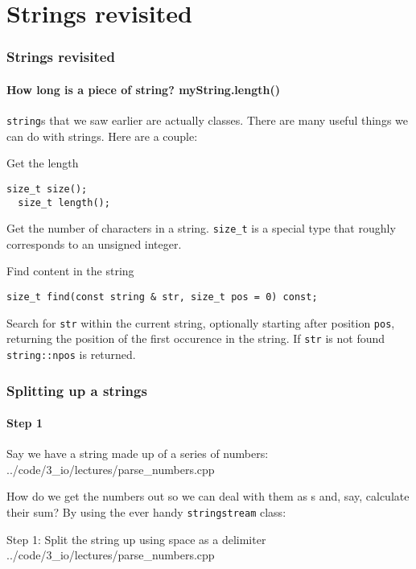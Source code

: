 \documentclass{beamer}
\begin{document}
\section{Strings revisited}

\begin{frame}[fragile]
  \frametitle{Strings revisited}
  \framesubtitle{How long is a piece of string? myString.length()}
  
  \texttt{string}s that we saw earlier are actually classes.  There are many useful things we can do with strings.  Here are a couple:
  \pause  
  \begin{block}{Get the length}
    \begin{lstlisting}[aboveskip=0pt]
  size_t size();
  size_t length();
    \end{lstlisting}
    Get the number of characters in a string.  \texttt{size\_t} is a special type that roughly corresponds to an unsigned integer.
  \end{block}
  \pause
  \begin{block}{Find content in the string}
    \begin{lstlisting}[aboveskip=0pt]
  size_t find(const string & str, size_t pos = 0) const;
    \end{lstlisting}
    Search for \texttt{str} within the current string, optionally starting after position \texttt{pos}, returning the position of the first occurence in the string.  If \texttt{str} is not found \texttt{string::npos} is returned.
  \end{block}

\end{frame}

\begin{frame}[fragile]
  \frametitle{Splitting up a strings}
  \framesubtitle{Step 1}
  
  Say we have a string made up of a series of numbers:
  	{../code/3_io/lectures/parse_numbers.cpp}

  How do we get the numbers out so we can deal with them as s and, say, calculate their sum?\newline\pause
  By using the ever handy \texttt{stringstream} class:

  \begin{block}{Step 1: Split the string up using space as a delimiter}
  		{../code/3_io/lectures/parse_numbers.cpp}
	\end{block}

\end{frame}
\end{document}
